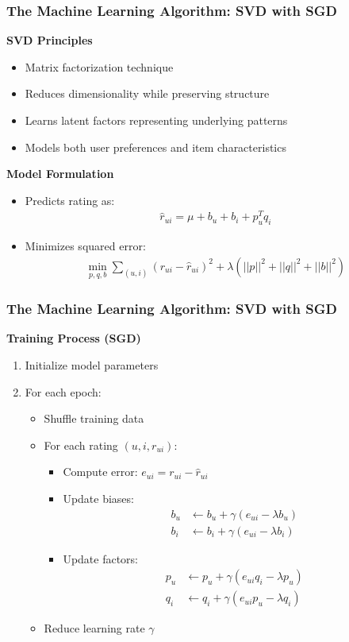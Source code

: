 \documentclass{beamer}
\begin{document}
\begin{frame}
\frametitle{The Machine Learning Algorithm: SVD with SGD}

\textbf{SVD Principles}
\begin{itemize}
    \item Matrix factorization technique
    \item Reduces dimensionality while preserving structure
    \item Learns latent factors representing underlying patterns
    \item Models both user preferences and item characteristics
\end{itemize}

\textbf{Model Formulation}
\begin{itemize}
    \item Predicts rating as:
    \begin{align*}
    \hat{r}_{ui} = \mu + b_u + b_i + p_u^T q_i
    \end{align*}
    \item Minimizes squared error:
    \begin{align*}
    \min_{p,q,b} \sum_{(u,i)} (r_{ui} - \hat{r}_{ui})^2 + \lambda(||p||^2 + ||q||^2 + ||b||^2)
    \end{align*}
\end{itemize}
\end{frame}

\begin{frame}
\frametitle{The Machine Learning Algorithm: SVD with SGD}
\textbf{Training Process (SGD)}
\begin{enumerate}
    \item Initialize model parameters
    \item For each epoch:
    \begin{itemize}
        \item Shuffle training data
        \item For each rating $(u,i,r_{ui})$:
        \begin{itemize}
            \item Compute error: $e_{ui} = r_{ui} - \hat{r}_{ui}$
            \item Update biases:
            \begin{align*}
            b_u &\leftarrow b_u + \gamma(e_{ui} - \lambda b_u)\\
            b_i &\leftarrow b_i + \gamma(e_{ui} - \lambda b_i)
            \end{align*}
            \item Update factors:
            \begin{align*}
            p_u &\leftarrow p_u + \gamma(e_{ui}q_i - \lambda p_u)\\
            q_i &\leftarrow q_i + \gamma(e_{ui}p_u - \lambda q_i)
            \end{align*}
        \end{itemize}
        \item Reduce learning rate $\gamma$
    \end{itemize}
\end{enumerate}
\end{frame}
\end{document}
